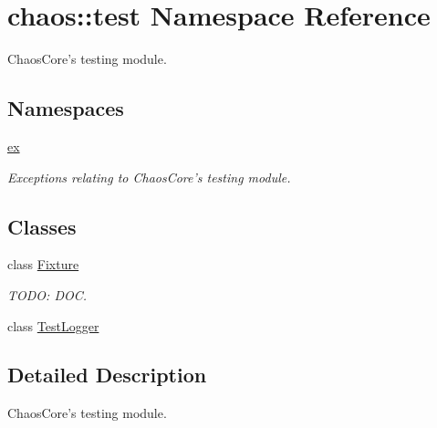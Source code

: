 \hypertarget{namespacechaos_1_1test}{\section{chaos\-:\-:test Namespace Reference}
\label{namespacechaos_1_1test}
}


Chaos\-Core's testing module.  


\subsection*{Namespaces}
\begin{DoxyCompactItemize}
\item 
\hyperlink{namespacechaos_1_1test_1_1ex}{ex}
\begin{DoxyCompactList}\small\item\em Exceptions relating to Chaos\-Core's testing module. \end{DoxyCompactList}\end{DoxyCompactItemize}
\subsection*{Classes}
\begin{DoxyCompactItemize}
\item 
class \hyperlink{classchaos_1_1test_1_1_fixture}{Fixture}
\begin{DoxyCompactList}\small\item\em T\-O\-D\-O\-: D\-O\-C. \end{DoxyCompactList}\item 
class \hyperlink{classchaos_1_1test_1_1_test_logger}{Test\-Logger}
\end{DoxyCompactItemize}


\subsection{Detailed Description}
Chaos\-Core's testing module. 